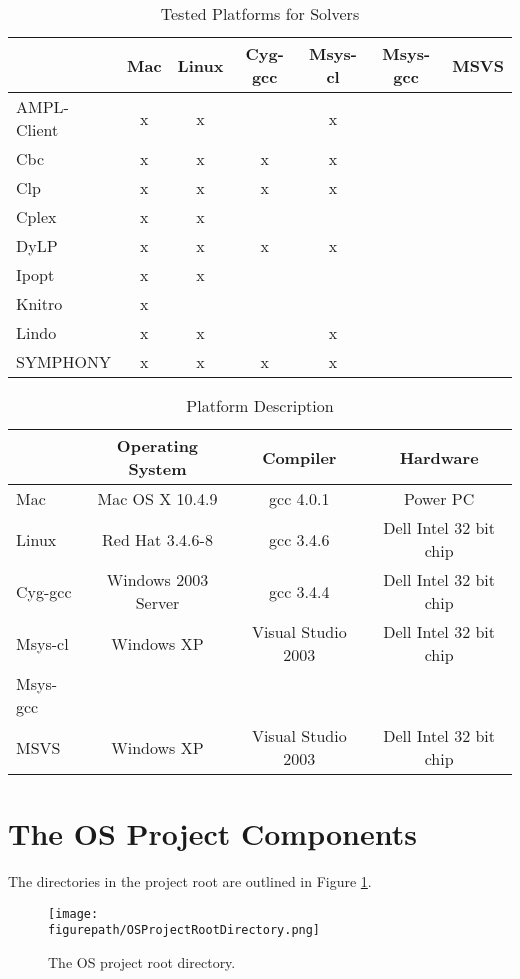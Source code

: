 \documentclass[11pt]{article}
\newcommand{\figurepath}{./figures}
\newcounter{Fig}
\renewcommand{\_}{{\char"5F}}
\renewcommand{\{}{{\char"7B}}
\renewcommand{\}}{{\char"7D}}
\renewcommand{\^}{{\char"0D}}
\renewcommand{\'}{{\char"0D}}
\begin{document}
\begin{table}
\caption{Tested Platforms for Solvers}
\centering
\label{table:testedplatforms}
\vskip 8pt
 \begin{tabular}{l|c|c|c|c|c|c|}
 &Mac&Linux&Cyg-gcc&Msys-cl&Msys-gcc&MSVS \\ \hline
AMPL-Client &x&x&&x&& \\ \hline
Cbc &x&x&x&x&& \\ \hline
Clp &x&x&x&x&& \\ \hline
Cplex &x&x&&&& \\ \hline
DyLP &x&x&x&x&& \\ \hline
Ipopt &x&x&&&& \\ \hline
Knitro &x&&&&& \\ \hline
Lindo &x&x&&x&& \\ \hline
SYMPHONY &x&x&x&x&& \\ \hline
\end{tabular}
\end{table}
 

 \begin{table}
\caption{Platform Description}
\centering
\label{table:platformdescription}
\vskip 8pt
 \begin{tabular}{l|c|c|c|}
 & {\bf Operating System} & {\bf Compiler} & {\bf  Hardware} \\ \hline
 Mac &Mac OS X 10.4.9&gcc 4.0.1&Power PC \\   \hline
 Linux &Red Hat 3.4.6-8&gcc 3.4.6& Dell Intel 32 bit chip\\ \hline
 Cyg-gcc &Windows 2003 Server&gcc 3.4.4& Dell Intel 32 bit chip \\ \hline
 Msys-cl &Windows XP&Visual Studio 2003 &Dell Intel 32 bit chip \\ \hline
 Msys-gcc &&& \\ \hline
 MSVS &Windows XP&Visual Studio 2003 &Dell Intel 32 bit chip \\ \hline
\end{tabular}
\end{table}
 

\section{The OS Project Components}\label{section:projectcomponents}

The directories in the  project root  are outlined in Figure  \ref{figure:osprojectrootdir}.

\begin{figure}
\centering
\texttt{[image: \\figurepath/OSProjectRootDirectory.png]}
\caption{The OS project root directory.} 
\label{figure:osprojectrootdir}
\end{figure}
\end{document}
